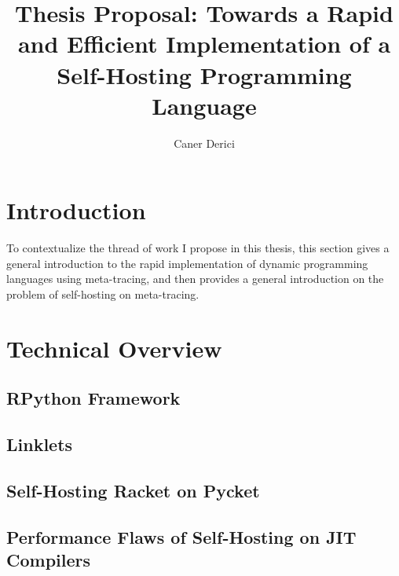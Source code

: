 \documentclass[9pt]{extarticle}
\title{Thesis Proposal: Towards a Rapid and Efficient Implementation
  of a Self-Hosting Programming Language}
\author{Caner Derici}
\begin{document}


\maketitle

\begin{abstract}
\end{abstract}

\tableofcontents

\newpage

\section{Introduction}

To contextualize the thread of work I propose in this thesis, this
section gives a general introduction to the rapid implementation of
dynamic programming languages using meta-tracing, and then provides a
general introduction on the problem of self-hosting on meta-tracing.





\section{Technical Overview}

%

%

%

\subsection{RPython Framework}

\subsection{Linklets}

\subsection{Self-Hosting Racket on Pycket}

\subsection{Performance Flaws of Self-Hosting on JIT Compilers}
\end{document}
